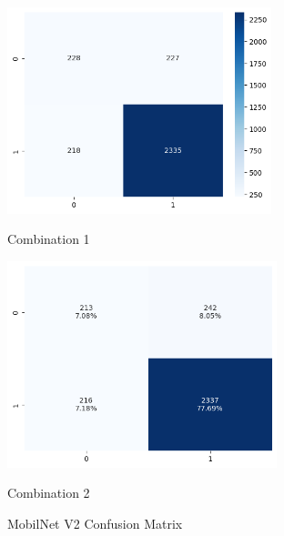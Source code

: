 \begin{figure}[H]
    \centering
    \begin{minipage}[b]{0.49\textwidth}
        \centering
        \includegraphics[width=\textwidth, height=6cm]{Figures/unbalanced_data/without bn/mn2/cm.png}
        \captionsetup{labelformat=empty}
        \caption{Combination 1}
        \label{fig:u_wo_r_cm}
    \end{minipage}
    \hfill
    \begin{minipage}[b]{0.49\textwidth}
        \centering
        \includegraphics[width=\textwidth, height=6cm]{Figures/unbalanced_data/with bn/mn2/cm.png}
        \captionsetup{labelformat=empty}
        \caption{Combination 2}
        \label{fig:u_w_r_cm}
    \end{minipage}
    \captionsetup{labelformat=default}
    \caption{MobilNet V2 Confusion Matrix}
\end{figure}


